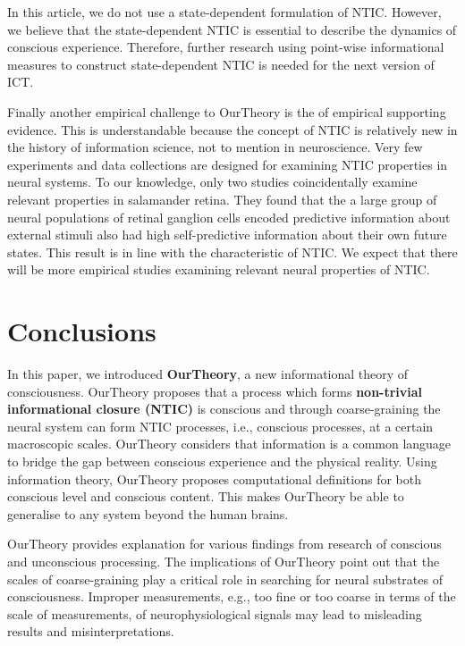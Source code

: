 \documentclass[utf8]{article}
\begin{document}
        In this article, we do not use a state-dependent formulation of NTIC. However, we believe that the state-dependent NTIC is essential to describe the dynamics of conscious experience. Therefore, further research using point-wise informational measures to construct state-dependent NTIC is needed for the next version of ICT.
        
        Finally another empirical challenge to \ac{OurTheory} is the  of empirical supporting evidence. This is understandable because the concept of NTIC is relatively new in the history of information science, not to mention in neuroscience. Very few experiments and data collections are designed for examining NTIC properties in neural systems. To our knowledge, only two studies \citep{Palmer2015, sederberg2018learning} coincidentally examine relevant properties in salamander retina. They found that the a large group of neural populations of retinal ganglion cells encoded predictive information about external stimuli also had high self-predictive information about their own future states. This result is in line with the characteristic of NTIC. We expect that there will be more empirical studies examining relevant neural properties of NTIC. 

    \section{Conclusions}
    In this paper, we introduced \textbf{\acf{OurTheory}}, a new informational theory of consciousness. \ac{OurTheory} proposes that a process which forms \textbf{non-trivial informational closure (NTIC)} is conscious and through coarse-graining the neural system can form NTIC processes, i.e., conscious processes, at a certain macroscopic scales. \ac{OurTheory} considers that information is a common language to bridge the gap between conscious experience and the physical reality. Using information theory, \ac{OurTheory} proposes computational definitions for both conscious level and conscious content. This makes \ac{OurTheory} be able to generalise to any system beyond the human brains. 
    
    \ac{OurTheory} provides explanation for various findings from research of conscious and unconscious processing. The implications of \ac{OurTheory} point out that the scales of coarse-graining play a critical role in searching for neural substrates of consciousness. Improper measurements, e.g., too fine or too coarse in terms of the scale of measurements, of neurophysiological signals may lead to misleading results and misinterpretations. 
    
\end{document}

